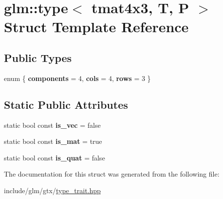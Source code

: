 \hypertarget{structglm_1_1type_3_01tmat4x3_00_01T_00_01P_01_4}{}\section{glm\+:\+:type$<$ tmat4x3, T, P $>$ Struct Template Reference}
\label{structglm_1_1type_3_01tmat4x3_00_01T_00_01P_01_4}
\subsection*{Public Types}
\begin{DoxyCompactItemize}
\item 
\mbox{\label{structglm_1_1type_3_01tmat4x3_00_01T_00_01P_01_4_a7f9ed6f6e2629bdd2a0abc202e5bb11b}} 
enum \{ {\bfseries components} = 4, 
{\bfseries cols} = 4, 
{\bfseries rows} = 3
 \}
\end{DoxyCompactItemize}
\subsection*{Static Public Attributes}
\begin{DoxyCompactItemize}
\item 
\mbox{\label{structglm_1_1type_3_01tmat4x3_00_01T_00_01P_01_4_a8c22325c199636bab17e66d3e5572d8b}} 
static bool const {\bfseries is\+\_\+vec} = false
\item 
\mbox{\label{structglm_1_1type_3_01tmat4x3_00_01T_00_01P_01_4_a1f5540d696a1308c534093c44c389f8a}} 
static bool const {\bfseries is\+\_\+mat} = true
\item 
\mbox{\label{structglm_1_1type_3_01tmat4x3_00_01T_00_01P_01_4_a0c8a60f09e04cac5f9bd175708edb29e}} 
static bool const {\bfseries is\+\_\+quat} = false
\end{DoxyCompactItemize}


The documentation for this struct was generated from the following file\+:\begin{DoxyCompactItemize}
\item 
include/glm/gtx/\hyperlink{type__trait_8hpp}{type\+\_\+trait.\+hpp}\end{DoxyCompactItemize}

